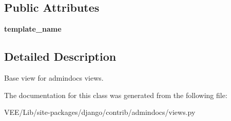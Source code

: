 \subsection*{Public Attributes}
\begin{DoxyCompactItemize}
\item 
\mbox{\label{classdjango_1_1contrib_1_1admindocs_1_1views_1_1_base_admin_docs_view_a706190799872fffe4c87454f047fe1d4}} 
{\bfseries template\+\_\+name}
\end{DoxyCompactItemize}


\subsection{Detailed Description}
\begin{DoxyVerb}Base view for admindocs views.
\end{DoxyVerb}
 

The documentation for this class was generated from the following file\+:\begin{DoxyCompactItemize}
\item 
V\+E\+E/\+Lib/site-\/packages/django/contrib/admindocs/views.\+py\end{DoxyCompactItemize}
